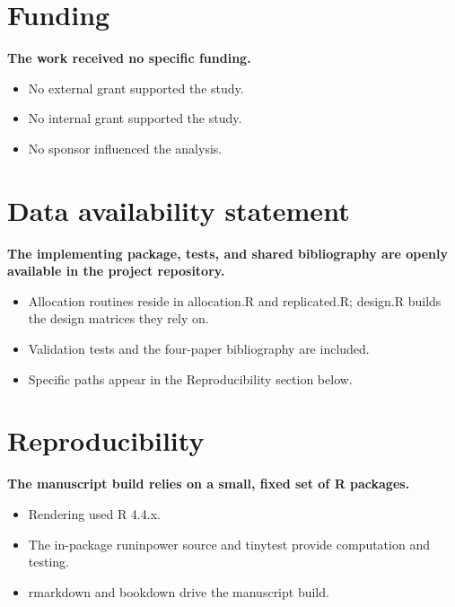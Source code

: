 \documentclass[
  11pt,
]{article}
\begin{document}
\section{Funding}\label{funding}

\textbf{The work received no specific funding.}

\begin{itemize}\setlength{\itemsep}{2pt}\setlength{\parskip}{0pt}
\item No external grant supported the study.
\item No internal grant supported the study.
\item No sponsor influenced the analysis.
\end{itemize}

\section{Data availability statement}\label{data-availability-statement}

\textbf{The implementing package, tests, and shared bibliography are openly available in the project repository.}

\begin{itemize}\setlength{\itemsep}{2pt}\setlength{\parskip}{0pt}
\item Allocation routines reside in allocation.R and replicated.R; design.R builds the design matrices they rely on.
\item Validation tests and the four-paper bibliography are included.
\item Specific paths appear in the Reproducibility section below.
\end{itemize}

\section{Reproducibility}\label{reproducibility}

\textbf{The manuscript build relies on a small, fixed set of R packages.}

\begin{itemize}\setlength{\itemsep}{2pt}\setlength{\parskip}{0pt}
\item Rendering used R 4.4.x.
\item The in-package runinpower source and tinytest provide computation and testing.
\item rmarkdown and bookdown drive the manuscript build.
\end{itemize}
\end{document}
